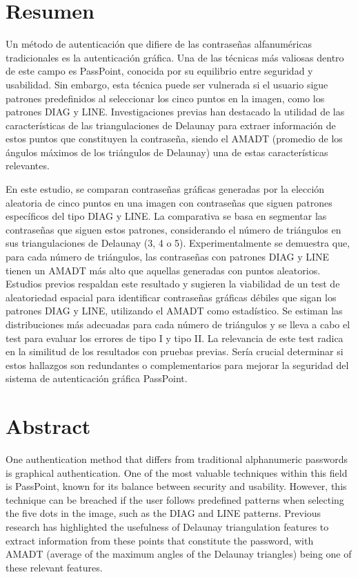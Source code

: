 \documentclass[12pt]{report}
\begin{document}
\chapter*{Resumen}
\hypertarget{Resumen}{}

	Un método de autenticación que difiere de las contraseñas alfanuméricas tradicionales es la autenticación gráfica. Una de las técnicas más valiosas dentro de este campo es PassPoint, conocida por su equilibrio entre seguridad y usabilidad. Sin embargo, esta técnica puede ser vulnerada si el usuario sigue patrones predefinidos al seleccionar los cinco puntos en la imagen, como los patrones DIAG y LINE. Investigaciones previas han destacado la utilidad de las características de las triangulaciones de Delaunay para extraer información de estos puntos que constituyen la contraseña, siendo el AMADT (promedio de los ángulos máximos de los triángulos de Delaunay) una de estas características relevantes.
	
	En este estudio, se comparan contraseñas gráficas generadas por la elección aleatoria de cinco puntos en una imagen con contraseñas que siguen patrones específicos del tipo DIAG y LINE. La comparativa se basa en segmentar las contraseñas que siguen estos patrones, considerando el número de triángulos en sus triangulaciones de Delaunay (3, 4 o 5). Experimentalmente se demuestra que, para cada número de triángulos, las contraseñas con patrones DIAG y LINE tienen un AMADT más alto que aquellas generadas con puntos aleatorios. Estudios previos respaldan este resultado y sugieren la viabilidad de un test de aleatoriedad espacial para identificar contraseñas gráficas débiles que sigan los patrones DIAG y LINE, utilizando el AMADT como estadístico. Se estiman las distribuciones más adecuadas para cada número de triángulos y se lleva a cabo el test para evaluar los errores de tipo I y tipo II.
	La relevancia de este test radica en la similitud de los resultados con pruebas previas. Sería crucial determinar si estos hallazgos son redundantes o complementarios para mejorar la seguridad del sistema de autenticación gráfica PassPoint.


\chapter*{Abstract}
\hypertarget{Abstract}{}
	One authentication method that differs from traditional alphanumeric passwords is graphical authentication. One of the most valuable techniques within this field is PassPoint, known for its balance between security and usability. However, this technique can be breached if the user follows predefined patterns when selecting the five dots in the image, such as the DIAG and LINE patterns. Previous research has highlighted the usefulness of Delaunay triangulation features to extract information from these points that constitute the password, with AMADT (average of the maximum angles of the Delaunay triangles) being one of these relevant features.
	
\end{document}
